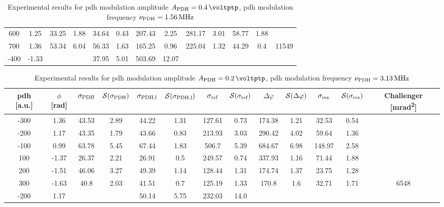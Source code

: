 \begin{landscape}
\begin{table}
\begin{tabular}{|c|c|c|c|c|c|c|c|c|c|c|c|c|}
		600 & 1.25 & 33.25 & 1.88 & 34.64 & 0.43 & 207.43 & 2.25 & 281.17 & 3.01 & 58.77 & 1.88 & \\
		700 & 1.36 & 53.34 & 6.04 & 56.33 & 1.63 & 165.25 & 0.96 & 225.04 & 1.32 & 44.29 & 0.4 & 11549\\
		\hline
		\hline
		-400 & -1.33 & & & 37.95 & 5.01 & 503.69 & 12.07 & & & & & \\
		\hline
	\end{tabular}
	\caption{Experimental results for \gls{pdh} modulation amplitude $\tind{A}{PDH} = \SI{0.4}{\voltptp}$, \gls{pdh} modulation frequency $\nu_{\text{PDH}} = \SI{1.56}{\mega\hertz}$}
	\end{table}
	
	
	\begin{table}
	\centering
	\begin{tabular}{|c|c|c|c|c|c|c|c|c|c|c|c|c|}
		\hline
		\gls{pdh} [a.u.] & $\phi$ [\si{\radian}] & $\sigma_{\text{PDH}}$ & $\mathcal{S}(\sigma_{\text{PDH}})$ & $\sigma_{\text{PDH,l}}$ & $\mathcal{S}(\sigma_{\text{PDH,l}})$  & $\sigma_{\text{ref}}$ & $\mathcal{S}(\sigma_{\text{ref}})$ & $\Delta \varphi$ & $\mathcal{S}(\Delta \varphi)$ & $\sigma_{\text{res}}$  & $\mathcal{S}(\sigma_{\text{res}})$ & Challenger [\si{\milli\radian\squared}] \\
		\hline
		\hline
		-300 & 1.36 & 43.53 & 2.89 & 44.22 & 1.31 & 127.61 & 0.73 & 174.38 & 1.21 & 32.53 & 0.54 & \\
		-200 & 1.17 & 43.35 & 1.79 & 43.66 & 0.83 & 213.93 & 3.03 & 290.42 & 4.02 & 59.64 & 1.36 & \\
		-100 & 0.99 & 63.78 & 5.45 & 67.44 & 1.83 & 506.7 & 5.39 & 684.67 & 6.98 & 148.97 & 2.58 & \\
		100 & -1.37 & 26.37 & 2.21 & 26.91 & 0.5 & 249.57 & 0.74 & 337.93 & 1.16 & 71.44 & 1.88 & \\
		200 & -1.51 & 46.06 & 3.27 & 49.39 & 1.14 & 128.44 & 1.31 & 174.74 & 1.37 & 23.75 & 1.28 & \\
		300 & -1.63 & 40.8 & 2.03 & 41.51 & 0.7 & 125.19 & 1.33 & 170.8 & 1.6 & 32.71 & 1.71 & 6548\\
		\hline
		\hline
		-200 & 1.17 & & & 50.14 & 5.75 & 232.03 & 14.0 & & & & & \\
		\hline
	\end{tabular}
	\caption{Experimental results for \gls{pdh} modulation amplitude $\tind{A}{PDH} = \SI{0.2}{\voltptp}$, \gls{pdh} modulation frequency $\nu_{\text{PDH}} = \SI{3.13}{\mega\hertz}$}
	\end{table}
	

\end{landscape}
